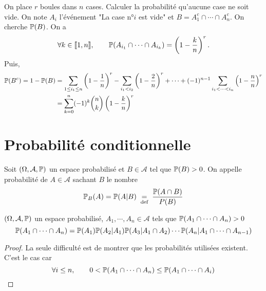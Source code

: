 \begin{ex}
    On place $r$ boules dans $n$ cases. Calculer la probabilité qu'aucune case ne soit vide. On note $A_i$ l'événement "La case n°$i$ est vide" et $B=A_1^c\cap \cdots \cap A_n^c$. On cherche $\P(B)$. On a \[
        \forall k \in  \llbracket 1, n\rrbracket, \qquad \P(A_{i_1}\cap \cdots \cap A_{i_k})= \left( 1-\frac{k}{n} \right) ^r.
    \] 
    Puis, \begin{align*}
        \P(B^c)=1-\P(B)&=\sum_{1\leq i_1\leq n} \left( 1-\frac{1}{n} \right) ^r-\sum_{i_1<i_2} \left( 1-\frac{2}{n} \right) ^r+\cdots +(-1)^{n-1} \sum_{i_1<\cdots <i_n} \left( 1-\frac{n}{n} \right) ^r\\
                       &=\sum_{k=0}^n(-1)^k\binom nk \left( 1-\frac{k}{n} \right) ^r
    \end{align*}
\end{ex}

\section{Probabilité conditionnelle}

\begin{dfn}
    Soit $(\Omega, \mathcal A, \P)$ un espace probabilisé et $B\in \mathcal A$ tel que $\P(B)>0$. On appelle probabilité de $A \in \mathcal A$ sachant $B$ le nombre  \[
        \P_B(A)=\P(A|B)\defeq \frac{\P(A\cap B)}{P(B)}
    \] 
\end{dfn}

\begin{prop}
    \Hyp $(\Omega, \mathcal A, \P)$ un espace probabilisé, $A_1, \cdots , A_n \in  \mathcal A$ tels que $\P(A_1 \cap \cdots \cap A_n)>0$
    \Conc \[
        \P(A_1\cap \cdots \cap A_n)=\P(A_1)\P(A_2|A_1)\P(A_3|A_1\cap A_2)\cdots \P(A_n|A_1\cap\cdots\cap A_{n-1})
    \] 
\end{prop}

\begin{proof}
    La seule difficulté est de montrer que les probabilités utilisées existent. C'est le cas car \[
        \forall i\leq n, \qquad 0<\P(A_1\cap\cdots\cap A_n)\leq \P(A_1\cap \cdots \cap A_i)
    \] 
\end{proof}
